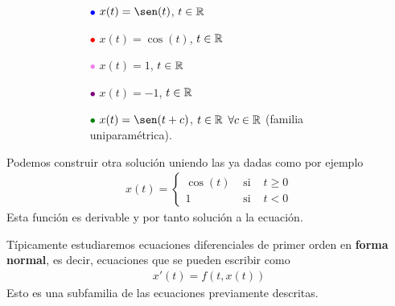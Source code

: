 \begin{ejemplo}
\begin{figure}[H]
\begin{subfigure}{0.3\textwidth}
        \end{subfigure}
        \hfill
        \begin{subfigure}{0.6\textwidth}%
            \begin{itemize}
                \item[\textcolor{blue}{$\bullet$}] $x(t) = \sen(t)$, $t \in \mathbb{R}$
                \item[\textcolor{red}{$\bullet$}] $x(t)= \cos(t)$, $t \in \mathbb{R}$
                \item[\textcolor{violet}{$\bullet$}] $x(t)=1$, $t \in \mathbb{R}$
                \item[\textcolor{purple}{$\bullet$}] $x(t)=-1$, $t \in \mathbb{R}$
                \item[\textcolor{green}{$\bullet$}] $x(t)=\sen(t+c)$, $t \in \mathbb{R}$ $\forall c \in \mathbb{R}$ (familia uniparamétrica).
            \end{itemize}
        \end{subfigure}
        \hfill
    \end{figure}

    Podemos construir otra solución uniendo las ya dadas como por ejemplo
    \begin{gather*}
        x(t)=\left\{
        \begin{array}{ccc}
            \cos(t)& \text{ si }& t \geq 0\\
            1&  \text{ si } & t <0
        \end{array}
        \right.
    \end{gather*}
    Esta función es derivable y por tanto solución a la ecuación.

\end{ejemplo}

Típicamente estudiaremos ecuaciones diferenciales de primer orden en \textbf{forma normal}, es decir, ecuaciones que se pueden escribir como
\begin{gather*}
    x'(t) = f(t, x(t))
\end{gather*}
Esto es una subfamilia de las ecuaciones previamente descritas.